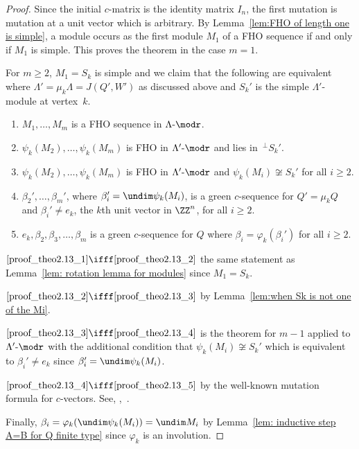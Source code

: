 \begin{proof} Since the initial $c$-matrix is the identity matrix $I_n$, the first mutation is mutation at a unit vector which is arbitrary. By Lemma~\ref{lem:FHO of length one is simple}, a module occurs as the first module $M_1$ of a FHO sequence if and only if $M_1$ is simple. This proves the theorem in the case $m=1$.

For $m\ge2$, $M_1=S_k$ is simple and we claim that the following are equivalent where $\Lambda'=\mu_k\Lambda=J(Q',W')$ as discussed above and $S_k'$ is the simple $\Lambda'$-module at vertex~$k$.
\begin{enumerate}
\item\label{proof_theo2.13_1} $M_1,\ldots,M_m$ is a FHO sequence in $\Lambda\text{-}\modr $.
\item\label{proof_theo2.13_2} $\psi_k(M_2),\ldots,\psi_k(M_m)$ is FHO in $\Lambda'\text{-}\modr $ and lies in $\,^\perp S_k'$.
\item\label{proof_theo2.13_3} $\psi_k(M_2),\ldots,\psi_k(M_m)$ is FHO in $\Lambda'\text{-}\modr $ and $\psi_k(M_i)\not\cong S_k'$ for all $i\ge2$.
\item\label{proof_theo2.13_4} $\beta_2',\ldots,\beta_m'$, where $\beta_i'=\undim \psi_k(M_i)$, is a green $c$-sequence for $Q'=\mu_kQ$ and $\beta_i'\neq e_k$, the $k$th unit vector in $\ZZ^n$, for all $i\ge2$.
\item\label{proof_theo2.13_5} $e_k,\beta_2,\beta_3,\ldots,\beta_m$ is a green $c$-sequence for $Q$ where $\beta_i=\varphi_k(\beta_i')$ for all $i\ge2$.
\end{enumerate}
$\eqref{proof_theo2.13_1}\ifff\eqref{proof_theo2.13_2}$ the same statement as Lemma~\ref{lem: rotation lemma for modules} since $M_1=S_k$.

\noindent$\eqref{proof_theo2.13_2}\ifff\eqref{proof_theo2.13_3}$ by Lemma~\ref{lem:when Sk is not one of the Mi}.

\noindent$\eqref{proof_theo2.13_3}\ifff\eqref{proof_theo2.13_4}$ is the theorem for $m-1$ applied to $\Lambda'\text{-}\modr $ with the additional condition that $\psi_k(M_i)\not\cong S_k'$ which is equivalent to $\beta_i'\neq e_k$ since $\beta_i'=\undim\psi_k(M_i)$.

\noindent$\eqref{proof_theo2.13_4}\ifff\eqref{proof_theo2.13_5}$ by the well-known mutation formula for $c$-vectors. See, \eg ,~\cite[Thm~2.1.8]{BHIT}.

Finally, $\beta_i=\varphi_k(\undim \psi_k(M_i))=\undim M_i$ by Lemma~\ref{lem: inductive step A=B for Q finite type} since $\varphi_k$ is an involution. \end{proof}
